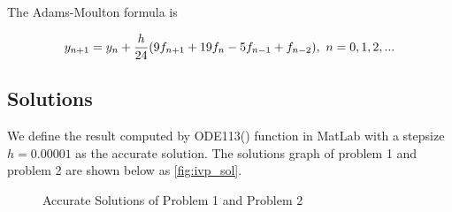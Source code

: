\documentclass[a4paper]{article}
\begin{document}
	The Adams-Moulton formula is
	
	\begin{equation}\label{eq.7}
		y_{n+1} = y_n + {h \over 24}(9f_{n+1} + 19f_{n} - 5f_{n-1} + f_{n-2}), \  n = 0,1,2,...
	\end{equation}
    \subsection{Solutions}
    We define the result computed by ODE113() function in MatLab with a stepsize $h=0.00001$ as the accurate solution. The solutions graph of problem 1 and problem 2 are shown below as \autoref{fig:ivp_sol}.
    
	\begin{figure}[H]
    \centering
    \centering
    \caption{\label{fig:ivp_sol} Accurate Solutions of Problem 1 and Problem 2}
    \end{figure}
	
\end{document}
